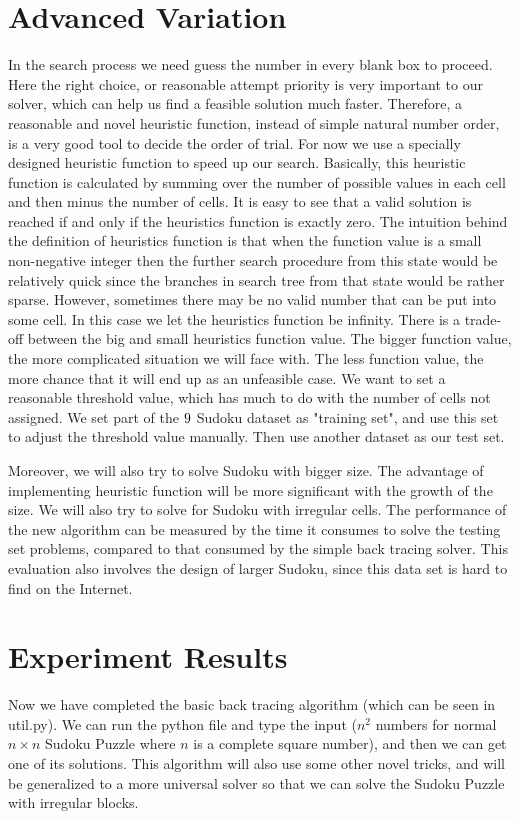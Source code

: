 \documentclass[12pt]{article}
\begin{document}
\begin{spacing}{1.1}
\section{Advanced Variation}
In the search process we need guess the number in every blank box to proceed. Here the right choice, or reasonable attempt priority is very important to our solver, which can help us find a feasible solution much faster. Therefore, a reasonable and novel heuristic function, instead of simple natural number order, is a very good tool to decide the order of trial. For now we use a specially designed heuristic function to speed up our search. Basically, this heuristic function is calculated by summing over the number of possible values in each cell and then minus the number of cells. It is easy to see that a valid solution is reached if and only if the heuristics function is exactly zero.  The intuition behind the definition of heuristics function is that when the function value is a small non-negative integer then the further search procedure from this state would be relatively quick since the branches in search tree from that state would be rather sparse. However, sometimes there may be no valid number that can be put into some cell. In this case we let the heuristics function be infinity. There is a trade-off between the big and small heuristics function value. The bigger function value, the more complicated situation we will face with. The less function value, the more chance that it will end up as an unfeasible case. We want to set a reasonable threshold value, which has much to do with the number of cells not assigned. We set part of the $9\time9$ Sudoku dataset as "training set", and use this set to adjust the threshold value manually. Then use another dataset as our test set.

Moreover, we will also try to solve Sudoku with bigger size. The advantage of implementing heuristic function will be more significant with the growth of the size. We will also try to solve for Sudoku with irregular cells. The performance of the new algorithm can be measured by the time it consumes to solve the testing set problems, compared to that consumed by the simple back tracing solver. This evaluation also involves the design of larger Sudoku, since this data set is hard to find on the Internet.

\section{Experiment Results}
Now we have completed the basic back tracing algorithm (which can be seen in util.py). We can run the python file and type the input ($n^2$ numbers for normal $n\times n$ Sudoku Puzzle where $n$ is a complete square number), and then we can get one of its solutions. This algorithm will also use some other novel tricks, and will be generalized to a more universal solver so that we can solve the Sudoku Puzzle with irregular blocks.


\end{spacing}
\end{document}
